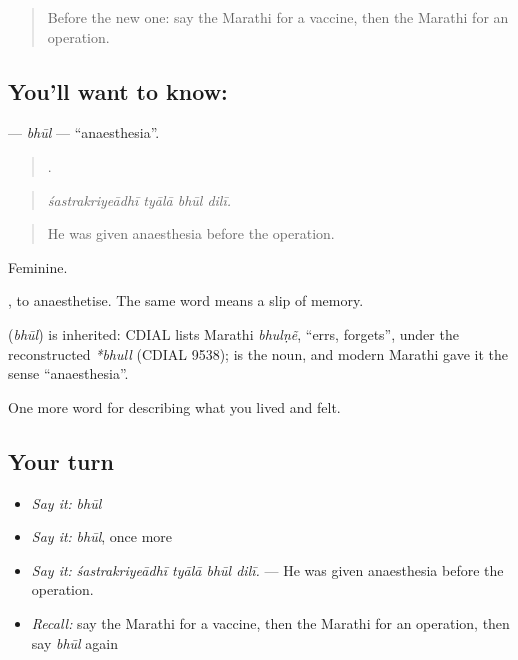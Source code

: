 \label{lesson:MR-C489-bhul}



\begin{quote}
Before the new one: say the Marathi for a vaccine, then the Marathi for an operation.
\end{quote}

\subsection*{You'll want to know: }
\textbf{} — \emph{bhūl} — \textquotedblleft{}anaesthesia\textquotedblright{}.

\begin{quote}
   .
\end{quote}

\begin{quote}
\emph{śastrakriyeādhī tyālā bhūl dilī.}
\end{quote}

\begin{quote}
He was given anaesthesia before the operation.
\end{quote}

Feminine.

 , to anaesthetise. The same word means a slip of memory.

\begin{cousinweb}
\textbf{} (\emph{bhūl}) is inherited: CDIAL lists Marathi \emph{bhulṇẽ}, \textquotedblleft{}errs, forgets\textquotedblright{}, under the reconstructed \emph{*bhull} (CDIAL 9538);  is the noun, and modern Marathi gave it the sense \textquotedblleft{}anaesthesia\textquotedblright{}.
\end{cousinweb}

\begin{grammarlens}[title={What you've built}]
One more word for describing what you lived and felt.
\end{grammarlens}

\subsection*{Your turn}
\begin{itemize}
\raggedright
  \item \emph{Say it:} \emph{bhūl}
  \item \emph{Say it:} \emph{bhūl}, once more
  \item \emph{Say it:} \emph{śastrakriyeādhī tyālā bhūl dilī.} — He was given anaesthesia before the operation.
  \item \emph{Recall:} say the Marathi for a vaccine, then the Marathi for an operation, then say \emph{bhūl} again
\end{itemize}


